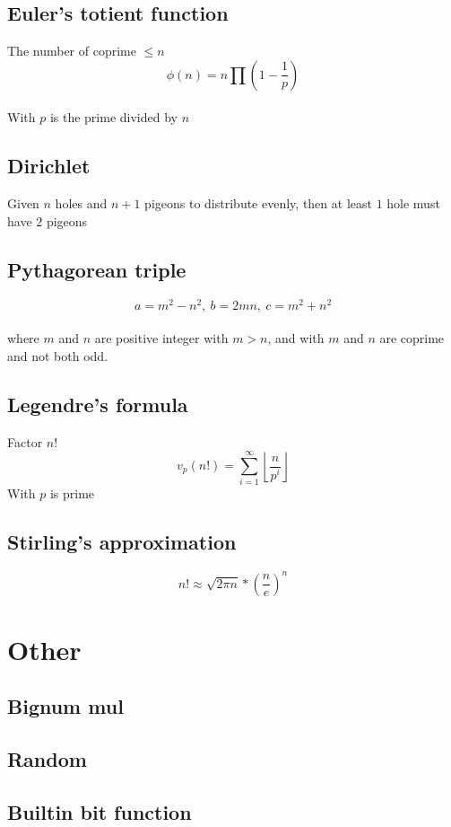 \documentclass[A4 paper, 12pt, oneside]{article}
\begin{document}
\begin{landscape}
\begin{multicols}{2}
	\subsection{Euler's totient function}
	The number of coprime $\leq n$ \\
	\[\phi(n) = n \prod (1 - \frac{1}{p}) \] \\
	With $p$ is the prime divided by $n$
	
	\subsection{Dirichlet}
	Given $n$ holes and $n + 1$ pigeons to distribute evenly, then at least $1$ hole must have $2$ pigeons
	
	\subsection{Pythagorean triple}
	\[a = m^2 - n^2, \ b = 2mn, \ c = m^2 + n^2 \] \\
	where $m$ and $n$ are positive integer with $m > n$, and with $m$ and $n$ are coprime and not both odd.
	
	\subsection{Legendre's formula}
	Factor $n!$
	\[v_p(n!) = \sum_{i = 1}^{\infty} \left \lfloor \frac{n}{p ^ i} \right \rfloor \]
	With $p$ is prime
	
	\subsection{Stirling's approximation}
	\[n! \approx \sqrt{2\pi n} * (\frac{n}{e}) ^ n\]

\section{Other}
	\subsection{Bignum mul}
	
	
	\subsection{Random}
	
	
	\subsection{Builtin bit function}
	
	

\end{multicols}
\end{landscape}
\end{document}
